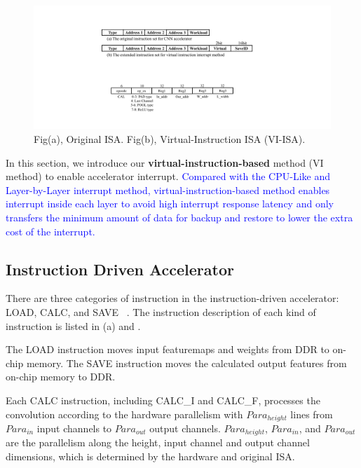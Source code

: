 \begin{figure}[t]
	\centering
	\includegraphics[width=0.99\linewidth]{fig/instructions.pdf}
	\vspace{-6mm}
	\caption{Fig(a), Original ISA. Fig(b), Virtual-Instruction ISA (VI-ISA).}
	\label{fig:instructions}
\end{figure}

In this section, we introduce our \textbf{virtual-instruction-based} method (VI method) to enable accelerator interrupt. 
\textcolor{blue}{
Compared with the CPU-Like and Layer-by-Layer interrupt method, virtual-instruction-based method enables interrupt inside each layer to avoid high interrupt response latency and only transfers the minimum amount of data for backup and restore to lower the extra cost of the interrupt.
}



\subsection{ Instruction Driven Accelerator }
\label{sec:instrAcc}
There are three categories of instruction in the instruction-driven accelerator: LOAD, CALC, and SAVE  ~\cite{guo2017angel,qiu2016going,yu2018instruction}. The instruction description of each kind of instruction is listed in (a) and .

The LOAD instruction moves input featuremaps and weights from DDR to on-chip memory. The SAVE instruction moves the calculated output features from on-chip memory to DDR. 

Each CALC  instruction,  including CALC\_I and CALC\_F, processes the convolution according to the hardware parallelism with $Para_{height}$ lines from $ Para_{in} $ input channels to $ Para_{out}$ output channels. $Para_{height}$, $ Para_{in} $, and $ Para_{out} $ are the parallelism along the height, input channel and output channel dimensions, which is determined by the hardware and original ISA.

